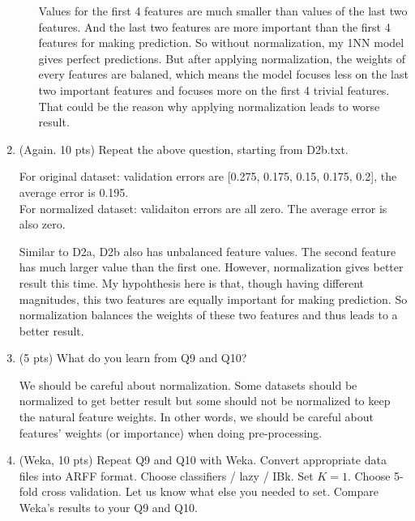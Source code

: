 \documentclass[a4paper]{article}
\theoremstyle{definition}
\newenvironment{soln}{
    \leavevmode\color{blue}\ignorespaces
}{}
\begin{document}
\begin{enumerate}
\begin{enumerate}
\begin{soln}  
Values for the first 4 features are much smaller than values of the last two features. And the last two features are more important than the first 4 features for making prediction. So without normalization, my 1NN model gives perfect predictions. But after applying normalization, the weights of every features are balaned, which means the model focuses less on the last two important features and focuses more on the first 4 trivial features. That could be the reason why applying normalization leads to worse result.
\end{soln}

  \end{enumerate}

\item (Again.  10 pts)
Repeat the above question, starting from D2b.txt.

\begin{soln} 
For original dataset: validation errors are [0.275, 0.175, 0.15, 0.175, 0.2], the average error is 0.195.\\
For normalized dataset: validaiton errors are all zero. The average error is also zero.

Similar to D2a, D2b also has unbalanced feature values. The second feature has much larger value than the first one. However, normalization gives better result this time. My hypohthesis here is that, though having different magnitudes, this two features are equally important for making prediction. So normalization balances the weights of these two features and thus leads to a better result.
\end{soln}

\item (5 pts) What do you learn from Q9 and Q10?


\begin{soln}  
We should be careful about normalization. Some datasets should be normalized to get better result but some should not be normalized to keep the natural feature weights. In other words, we should be careful about features' weights (or importance) when doing pre-processing. 
\end{soln}

\item (Weka, 10 pts)
Repeat Q9 and Q10 with Weka.
Convert appropriate data files into ARFF format.
Choose classifiers / lazy / IBk.
Set $K=1$.
Choose 5-fold cross validation.
Let us know what else you needed to set.  Compare Weka's results to your Q9 and Q10.


\end{enumerate}
\end{document}
